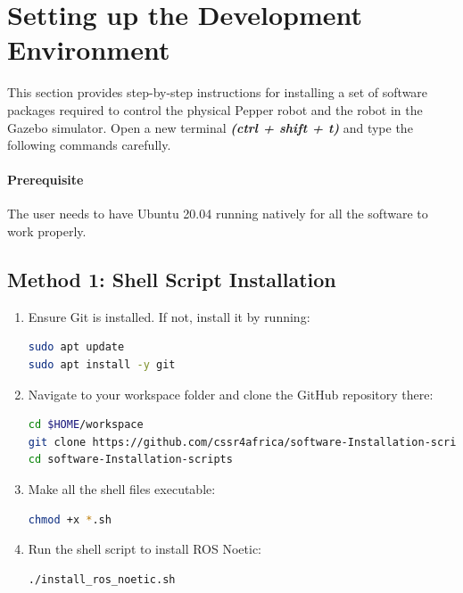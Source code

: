 \documentclass{CSSRforAfrica}
\begin{document}
\section{Setting up the Development Environment}
{
\label{devenv}
This section provides step-by-step instructions for installing a set of software packages required to control the physical Pepper robot and the robot in the Gazebo simulator. Open a new terminal \textit{\textbf{(ctrl + shift + t)}} and type the following commands carefully. 

\paragraph{Prerequisite}

{The user needs to have Ubuntu 20.04 running natively for all the software to work properly.} 

\vspace{1em}

\begingroup
{}

\subsection{Method 1: Shell Script Installation}

\begin{enumerate}
\item Ensure Git is installed. If not, install it by running:
\begin{lstlisting}[style=withoutNumbering, language=bash]
sudo apt update
sudo apt install -y git
\end{lstlisting}

\item Navigate to your workspace folder and clone the GitHub repository there:
\begin{lstlisting}[style=withoutNumbering, language=bash]
cd $HOME/workspace
git clone https://github.com/cssr4africa/software-Installation-scripts.git
cd software-Installation-scripts
\end{lstlisting}

\item Make all the shell files executable:
\begin{lstlisting}[style=withoutNumbering, language=bash]
chmod +x *.sh
\end{lstlisting}

\item Run the shell script to install ROS Noetic:
\begin{lstlisting}[style=withoutNumbering, language=bash]
./install_ros_noetic.sh
\end{lstlisting}


\end{enumerate}}
\end{document}
